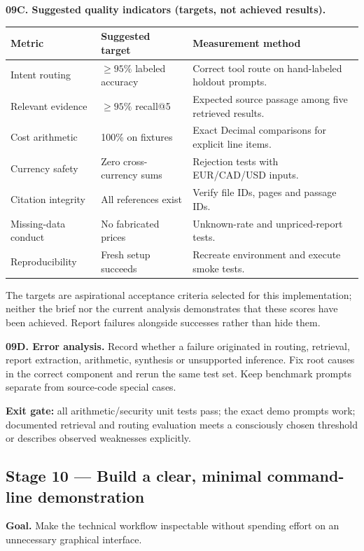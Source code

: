 \documentclass[11pt,a4paper]{article}
\begin{document}
\textbf{09C. Suggested quality indicators (targets, not achieved results).}\par\medskip\noindent
\begin{tabularx}{\textwidth}{@{}L{39mm}L{38mm}Y@{}}
\toprule\textbf{Metric} & \textbf{Suggested target} & \textbf{Measurement method}\\\midrule
Intent routing & \(\geq95\%\) labeled accuracy & Correct tool route on hand-labeled holdout prompts.\\
Relevant evidence & \(\geq95\%\) recall@5 & Expected source passage among five retrieved results.\\
Cost arithmetic & 100\% on fixtures & Exact Decimal comparisons for explicit line items.\\
Currency safety & Zero cross-currency sums & Rejection tests with EUR/CAD/USD inputs.\\
Citation integrity & All references exist & Verify file IDs, pages and passage IDs.\\
Missing-data conduct & No fabricated prices & Unknown-rate and unpriced-report tests.\\
Reproducibility & Fresh setup succeeds & Recreate environment and execute smoke tests.\\
\bottomrule
\end{tabularx}\par\medskip
The targets are aspirational acceptance criteria selected for this implementation; neither the brief nor the current analysis demonstrates that these scores have been achieved. Report failures alongside successes rather than hide them.

\textbf{09D. Error analysis.} Record whether a failure originated in routing, retrieval, report extraction, arithmetic, synthesis or unsupported inference. Fix root causes in the correct component and rerun the same test set. Keep benchmark prompts separate from source-code special cases.

\textbf{Exit gate:} all arithmetic/security unit tests pass; the exact demo prompts work; documented retrieval and routing evaluation meets a consciously chosen threshold or describes observed weaknesses explicitly.

\subsection{Stage 10 --- Build a clear, minimal command-line demonstration}
\textbf{Goal.} Make the technical workflow inspectable without spending effort on an unnecessary graphical interface.
\end{document}
